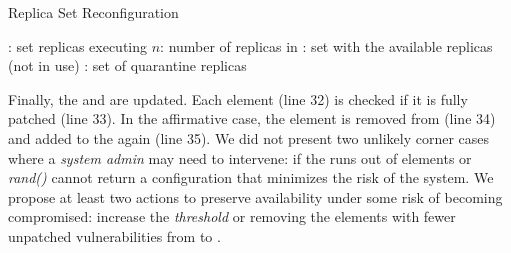 {\centering
\begin{minipage}{.8\linewidth}
\small
\begin{algorithm}[H]
\caption{Replica Set Reconfiguration}\label{alg:algorithm2}
{\small
\ES: set replicas executing \;
$n$: number of replicas in \ES\;
\RS: set with the available replicas (not in use)\;
\QS: set of quarantine replicas\;
\BlankLine
{}
}
\end{algorithm}
\end{minipage}
\par
}

Finally, the \RS and \QS are updated.
Each \QS element (line 32) is checked if it is fully patched (line 33).
In the affirmative case, the element is removed from \QS (line 34) and added to the \RS again (line 35).
We did not present two unlikely corner cases where a \emph{system admin} may need to intervene: if the \RS runs out of elements or \emph{rand()} cannot return a configuration that minimizes the risk of the system.
We propose at least two actions to preserve availability under some risk of becoming compromised: increase the \emph{threshold} or removing the elements with fewer unpatched vulnerabilities from \QS to \RS.

